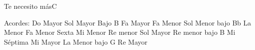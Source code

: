 \documentclass[12pt, spanish]{book}
\begin{document}
\begin{song}{Te necesito más}{C}
        \ifChordBk
        \begin{SBOpGroup}
            Acordes:
            \upchord{\C}\qquad Do Mayor \hfill
            \upchord{\GB}\qquad Sol Mayor Bajo B \hfill\null\break
            \upchord{\F}\qquad Fa Mayor \hfill
            \upchord{\Fm}\qquad Fa Menor \hfill\null\break
            \upchord{\GmBflat}\qquad Sol Menor bajo Bb \hfill
            \upchord{\Am}\qquad La Menor \hfill\null\break
            \upchord{\Fmsix}\qquad Fa Menor Sexta \hfill
            \upchord{\Em}\qquad Mi Menor \hfill\null\break
            \upchord{\Dm}\qquad Re menor  \hfill
            \upchord{\G}\qquad Sol Mayor \hfill\null\break
            \upchord{\DmB}\qquad Re menor bajo B \hfill
            \upchord{\Eseven}\qquad Mi S\'eptima \hfill\null\break
            \upchord{\E}\qquad Mi Mayor \hfill
            \upchord{\AmG}\qquad La Menor bajo G \hfill
            \upchord{\D}\qquad Re Mayor \hfill\null\break
        \end{SBOpGroup}
        \fi
    \end{song}
\end{document}
